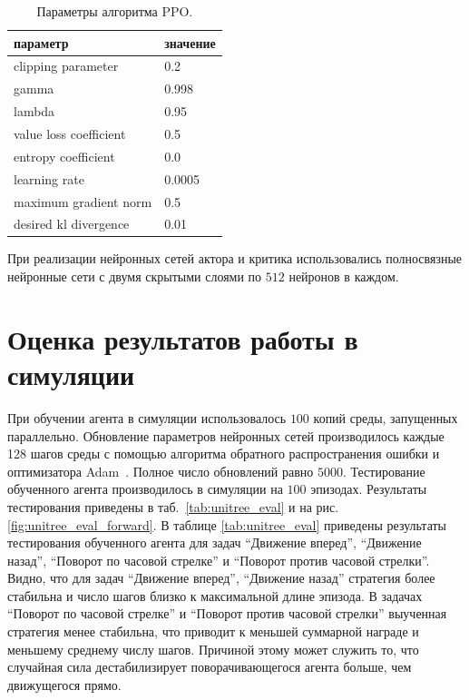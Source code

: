 \begin{table} [htbp]
    \centering
    \begin{threeparttable}
        \caption{Параметры алгоритма PPO.}\label{tab:ppoparams}
        \begin{tabular}{| p{8cm} || p{8cm} |}
            \hline
            \hline
            параметр & значение \\
            \hline
            clipping parameter &	0.2 \\
            gamma &	0.998 \\
            lambda &	0.95 \\
            value loss coefficient &	0.5 \\
            entropy coefficient &	0.0 \\
            learning rate &	0.0005 \\
            maximum gradient norm &	0.5 \\
            desired kl divergence &	0.01 \\
            \hline
            \hline
        \end{tabular}
    \end{threeparttable}
\end{table}

При реализации нейронных сетей актора и критика использовались полносвязные нейронные сети с двумя скрытыми слоями по $512$ нейронов в каждом. 

\section{Оценка результатов работы в симуляции}

При обучении агента в симуляции использовалось $100$ копий среды, запущенных параллельно. Обновление параметров нейронных сетей производилось каждые 128 шагов среды с помощью алгоритма обратного распространения ошибки и оптимизатора Adam~\cite{kingma2014adam}. Полное число обновлений равно $5000$. Тестирование обученного агента производилось в симуляции на $100$ эпизодах. Результаты тестирования приведены в таб.~\ref{tab:unitree_eval} и на рис.~ \ref{fig:unitree_eval_forward}. В таблице \ref{tab:unitree_eval} приведены результаты тестирования обученного агента для задач ``Движение вперед'', ``Движение назад'', ``Поворот по часовой стрелке'' и ``Поворот против часовой стрелки''. Видно, что для задач ``Движение вперед'', ``Движение назад'' стратегия более стабильна и число шагов близко к максимальной длине эпизода. В задачах ``Поворот по часовой стрелке'' и ``Поворот против часовой стрелки'' выученная стратегия менее стабильна, что приводит к меньшей суммарной награде и меньшему среднему числу шагов. Причиной этому может служить то, что случайная сила дестабилизирует поворачивающегося агента больше, чем движущегося прямо.

